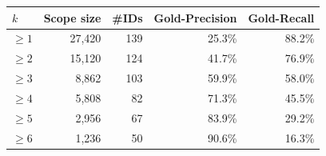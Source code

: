 \begin{tabular}{lrrrr}
\toprule
$k$ & Scope size & \#IDs & Gold-Precision & Gold-Recall \\
\midrule
$\geq 1$ & 27,420 & 139 & 25.3\% & 88.2\% \\
$\geq 2$ & 15,120 & 124 & 41.7\% & 76.9\% \\
$\geq 3$ & 8,862 & 103 & 59.9\% & 58.0\% \\
$\geq 4$ & 5,808 & 82 & 71.3\% & 45.5\% \\
$\geq 5$ & 2,956 & 67 & 83.9\% & 29.2\% \\
$\geq 6$ & 1,236 & 50 & 90.6\% & 16.3\% \\
\bottomrule
\end{tabular}
